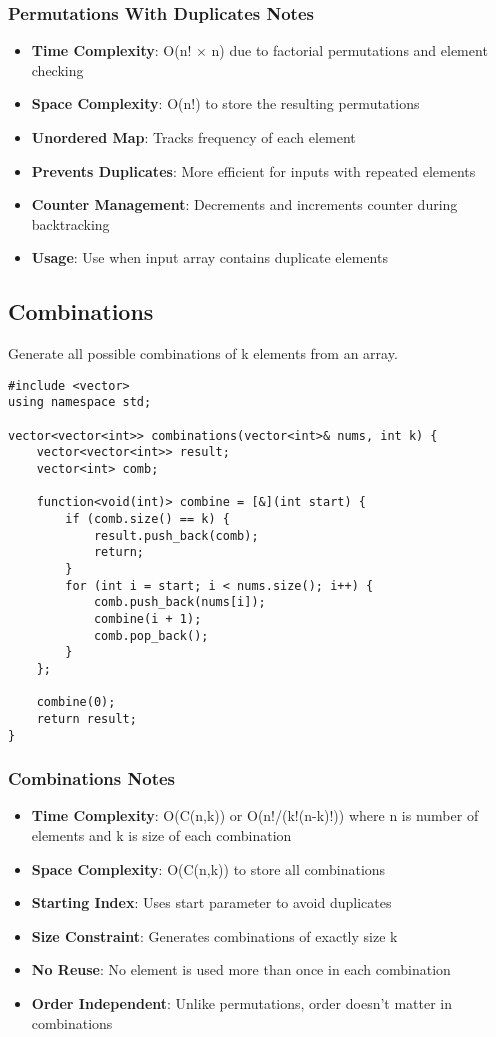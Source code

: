 \documentclass[11pt,a4paper]{article}
\begin{document}
\subsubsection*{Permutations With Duplicates Notes}
\begin{itemize}
\item \textbf{Time Complexity}: O(n! × n) due to factorial permutations and element checking
\item \textbf{Space Complexity}: O(n!) to store the resulting permutations
\item \textbf{Unordered Map}: Tracks frequency of each element
\item \textbf{Prevents Duplicates}: More efficient for inputs with repeated elements
\item \textbf{Counter Management}: Decrements and increments counter during backtracking
\item \textbf{Usage}: Use when input array contains duplicate elements
\end{itemize}

\newpage
\subsection{Combinations}
Generate all possible combinations of k elements from an array.

\begin{lstlisting}[caption={Combinations Implementation}]
#include <vector>
using namespace std;

vector<vector<int>> combinations(vector<int>& nums, int k) {
    vector<vector<int>> result;
    vector<int> comb;

    function<void(int)> combine = [&](int start) {
        if (comb.size() == k) {
            result.push_back(comb);
            return;
        }
        for (int i = start; i < nums.size(); i++) {
            comb.push_back(nums[i]);
            combine(i + 1);
            comb.pop_back();
        }
    };

    combine(0);
    return result;
}
\end{lstlisting}

\subsubsection*{Combinations Notes}
\begin{itemize}
\item \textbf{Time Complexity}: O(C(n,k)) or O(n!/(k!(n-k)!)) where n is number of elements and k is size of each combination
\item \textbf{Space Complexity}: O(C(n,k)) to store all combinations
\item \textbf{Starting Index}: Uses start parameter to avoid duplicates
\item \textbf{Size Constraint}: Generates combinations of exactly size k
\item \textbf{No Reuse}: No element is used more than once in each combination
\item \textbf{Order Independent}: Unlike permutations, order doesn't matter in combinations
\end{itemize}
\end{document}
